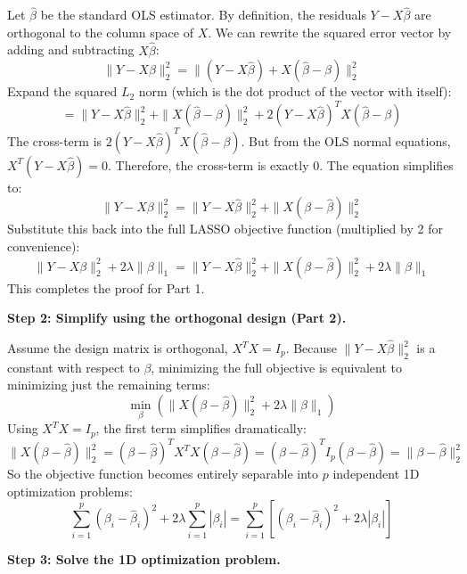 \begin{solution}
Let $\hat{\beta}$ be the standard OLS estimator. By definition, the residuals $Y - X\hat{\beta}$ are orthogonal to the column space of $X$.
We can rewrite the squared error vector by adding and subtracting $X\hat{\beta}$:
\[ \|Y - X\beta\|_2^2 = \|(Y - X\hat{\beta}) + X(\hat{\beta} - \beta)\|_2^2 \]
Expand the squared $L_2$ norm (which is the dot product of the vector with itself):
\[ = \|Y - X\hat{\beta}\|_2^2 + \|X(\hat{\beta} - \beta)\|_2^2 + 2(Y - X\hat{\beta})^T X(\hat{\beta} - \beta) \]
The cross-term is $2(Y - X\hat{\beta})^T X(\hat{\beta} - \beta)$. But from the OLS normal equations, $X^T(Y - X\hat{\beta}) = 0$.
Therefore, the cross-term is exactly 0. The equation simplifies to:
\[ \|Y - X\beta\|_2^2 = \|Y - X\hat{\beta}\|_2^2 + \|X(\beta - \hat{\beta})\|_2^2 \]
Substitute this back into the full LASSO objective function (multiplied by 2 for convenience):
\[ \|Y - X\beta\|_2^2 + 2\lambda \|\beta\|_1 = \|Y - X\hat{\beta}\|_2^2 + \|X(\beta - \hat{\beta})\|_2^2 + 2\lambda \|\beta\|_1 \]
This completes the proof for Part 1.

\textbf{Step 2: Simplify using the orthogonal design (Part 2).}

Assume the design matrix is orthogonal, $X^T X = I_p$.
Because $\|Y - X\hat{\beta}\|_2^2$ is a constant with respect to $\beta$, minimizing the full objective is equivalent to minimizing just the remaining terms:
\[ \min_\beta \left( \|X(\beta - \hat{\beta})\|_2^2 + 2\lambda \|\beta\|_1 \right) \]
Using $X^T X = I_p$, the first term simplifies dramatically:
\[ \|X(\beta - \hat{\beta})\|_2^2 = (\beta - \hat{\beta})^T X^T X (\beta - \hat{\beta}) = (\beta - \hat{\beta})^T I_p (\beta - \hat{\beta}) = \|\beta - \hat{\beta}\|_2^2 \]
So the objective function becomes entirely separable into $p$ independent 1D optimization problems:
\[ \sum_{i=1}^p (\beta_i - \hat{\beta}_i)^2 + 2\lambda \sum_{i=1}^p |\beta_i| = \sum_{i=1}^p \left[ (\beta_i - \hat{\beta}_i)^2 + 2\lambda |\beta_i| \right] \]

\textbf{Step 3: Solve the 1D optimization problem.}


\end{solution}
